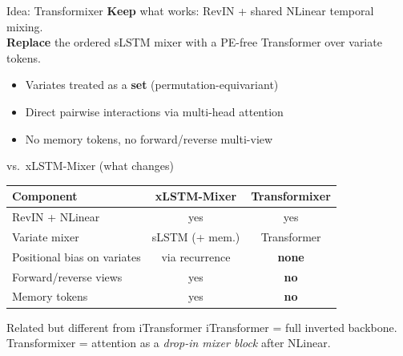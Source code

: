 \documentclass[aspectratio=169,11pt]{beamer}
\begin{document}
\begin{frame}{Idea: Transformixer}
  \textbf{Keep} what works: RevIN + shared NLinear temporal mixing.\\
  \textbf{Replace} the ordered sLSTM mixer with a PE-free Transformer over variate tokens.

  \vspace{0.8em}
  \centering

  \vspace{0.8em}
  \begin{itemize}
    \item Variates treated as a \textbf{set} (permutation-equivariant)
    \item Direct pairwise interactions via multi-head attention
    \item No memory tokens, no forward/reverse multi-view
  \end{itemize}
\end{frame}

\begin{frame}{vs.\ xLSTM-Mixer (what changes)}
  \centering
  \begin{tabular}{lcc}
    \toprule
    Component & xLSTM-Mixer & Transformixer \\
    \midrule
    RevIN + NLinear & yes & yes \\
    Variate mixer & sLSTM (+ mem.) & Transformer \\
    Positional bias on variates & via recurrence & \textbf{none} \\
    Forward/reverse views & yes & \textbf{no} \\
    Memory tokens & yes & \textbf{no} \\
    \bottomrule
  \end{tabular}

  \vspace{1em}
  \begin{block}{Related but different from iTransformer}
    iTransformer = full inverted backbone.\\
    Transformixer = attention as a \emph{drop-in mixer block} after NLinear.
  \end{block}
\end{frame}
\end{document}
